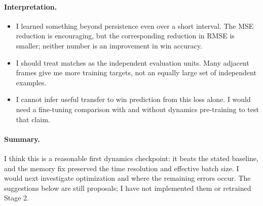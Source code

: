 \documentclass[11pt]{article}
\begin{document}
    \paragraph{Interpretation.}
    \begin{itemize}
        \item I learned something beyond persistence even over a short interval.
        The MSE reduction is encouraging, but the corresponding reduction in
        RMSE is smaller; neither number is an improvement in win accuracy.
        \item I should treat matches as the independent evaluation units.
        Many adjacent frames give me more training targets, not an equally large
        set of independent examples.
        \item I cannot infer useful transfer to win prediction from this loss
        alone. I would need a fine-tuning comparison with and without dynamics
        pre-training to test that claim.
    \end{itemize}

    \paragraph{Summary.}
    I think this is a reasonable first dynamics checkpoint: it beats the stated
    baseline, and the memory fix preserved the time resolution and effective
    batch size. I would next investigate optimization and where the remaining
    errors occur. The suggestions below are still proposals; I have not
    implemented them or retrained Stage 2.
\end{document}

